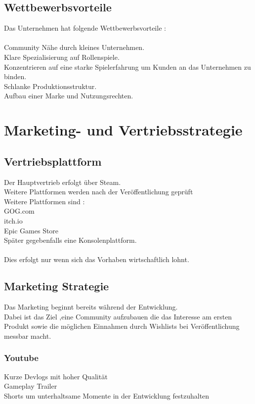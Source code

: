 \documentclass[envcountsame,envcountchap deutsch]{i-studis}
\begin{document}
\section{Wettbewerbsvorteile}
Das Unternehmen hat folgende Wettbewerbsvorteile :\\
\\
Community Nähe durch kleines Unternehmen.\\
Klare Spezialisierung auf Rollenspiele. \\
Konzentrieren auf eine starke Spielerfahrung um Kunden an das Unternehmen zu binden. \\
Schlanke Produktionsstruktur. \\
Aufbau einer Marke und Nutzungsrechten.\\

\chapter{Marketing- und Vertriebsstrategie}
\section{Vertriebsplattform}

Der Hauptvertrieb erfolgt über Steam.\\
Weitere Plattformen werden nach der Veröffentlichung geprüft\\

Weitere Plattformen sind :\\
GOG.com \\
itch.io \\
Epic Games Store \\
Später gegebenfalls eine Konsolenplattform.\\
\\
Dies erfolgt nur wenn sich das Vorhaben wirtschaftlich lohnt.
\pagebreak
\section{Marketing Strategie}

Das Marketing beginnt bereits während der Entwicklung.\\
Dabei ist das Ziel ,eine Community aufzubauen die das Interesse am ersten Produkt sowie die möglichen Einnahmen durch Wishlists bei Veröffentlichung messbar macht.

\subsection{Youtube}
Kurze Devlogs mit hoher Qualität \\
Gameplay Trailer \\
Shorts um unterhaltsame Momente in der Entwicklung festzuhalten\\
\end{document}
